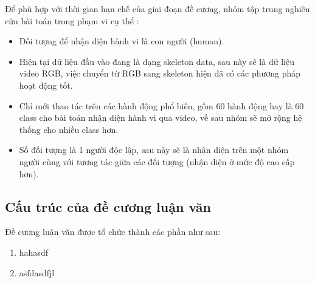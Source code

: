 Để phù hợp với thời gian  hạn chế của giai đoạn đề cương, nhóm tập trung nghiên cứu bài toán trong phạm vi cụ thể :
\begin{itemize}
    \item Đối tượng để nhận diện hành vi là con người (human).
    \item Hiện tại dữ liệu đầu vào đang là dạng skeleton data, sau này sẽ là dữ liệu video RGB, việc chuyển từ RGB sang skeleton hiện
          đã có các phương pháp hoạt động tốt.
    \item Chỉ mới thao tác trên các hành động phổ biến, gồm 60 hành động hay là 60 class cho bài toán nhận diện hành vi qua video, về sau nhóm sẽ mở rộng
          hệ thống cho nhiều class hơn.
    \item Số đối tượng là 1 người độc lập, sau này sẽ là nhận diện trên một nhóm người cùng với tương tác giữa các đối tượng (nhận diện ở mức độ cao cấp hơn).
\end{itemize}

\subsection{Cấu trúc của đề cương luận văn}
Đề cương luận văn được tổ chức thành các  phần như sau:


\begin{enumerate}[Chương *]
    \item  hahasdf
    \item asfdasdfjl

\end{enumerate}


